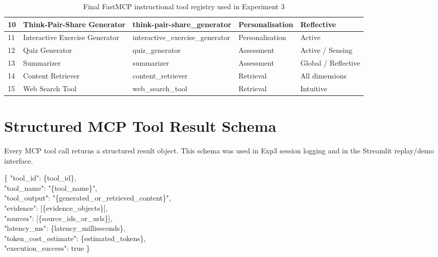 \begin{table}[h]
\begin{tabular}{|p{0.5cm}|p{4.5cm}|p{3cm}|p{3.6cm}|p{3.2cm}|}
        \hline
        10 & Think-Pair-Share Generator & think-pair-share\_generator & Personalisation & Reflective \\
        \hline
        11 & Interactive Exercise Generator & interactive\_exercise\_generator & Personalisation & Active \\
        \hline
        12 & Quiz Generator & quiz\_generator & Assessment & Active / Sensing \\
        \hline
        13 & Summarizer & summarizer & Assessment & Global / Reflective \\
        \hline
        14 & Content Retriever & content\_retriever & Retrieval & All dimensions \\
        \hline
        15 & Web Search Tool & web\_search\_tool & Retrieval & Intuitive \\
        \hline
    \end{tabular}
    \caption{Final FastMCP instructional tool registry used in Experiment 3}
    \label{tab:tool-registry}
\end{table}

\section{Structured MCP Tool Result Schema}
Every MCP tool call returns a structured result object. This schema was used in Exp3 session logging and in the Streamlit replay/demo interface.
\begin{shadedquotation}
\{
    "tool\_id": \{tool\_id\}, \\
    "tool\_name": "\{tool\_name\}", \\
    "tool\_output": "\{generated\_or\_retrieved\_content\}", \\
    "evidence": [\{evidence\_objects\}], \\
    "sources": [\{source\_ids\_or\_urls\}], \\
    "latency\_ms": \{latency\_milliseconds\}, \\
    "token\_cost\_estimate": \{estimated\_tokens\}, \\
    "execution\_success": true
\}
\end{shadedquotation}

